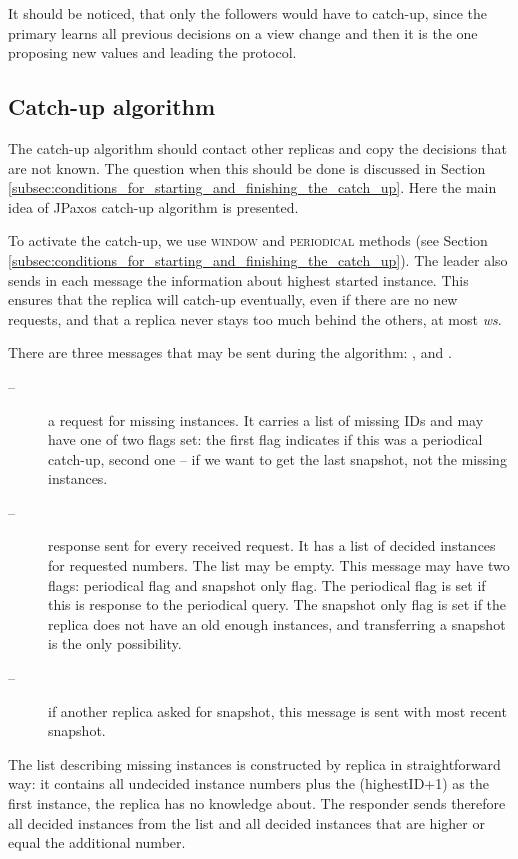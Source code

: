 It should be noticed, that only the followers would have to catch-up, since the primary learns all previous decisions on a view change and then it is the one proposing new values and leading the protocol.

\subsection{Catch-up algorithm}
\label{subsec:catch_up_algorithm}
The catch-up algorithm should contact other replicas and copy the decisions that are not known. The question when this should be done is discussed in Section \ref{subsec:conditions_for_starting_and_finishing_the_catch_up}. Here the main idea of JPaxos catch-up algorithm is presented.

To activate the catch-up, we use \textsc{window} and \textsc{periodical} methods (see Section \ref{subsec:conditions_for_starting_and_finishing_the_catch_up}). The leader also sends in each \alive message the information about highest started instance.
This ensures that the replica will catch-up eventually, even if there are no new requests, and that a replica never stays too much behind the others, at most \textit{ws}.

There are three messages that may be sent during the algorithm: \catchUpQuery[], \catchUpResponse and \catchUpSnapshot[].
\begin{description}
 \item[\normalfont\catchUpQuery --] a request for missing instances. It carries a list of missing IDs and may have one of two flags set: the first flag indicates if this was a periodical catch-up, second one -- 
 if we want to get the last snapshot, not the missing instances.
 \item[\normalfont\catchUpResponse --] response sent for every received request. It has a list of decided instances for requested numbers. The list may be empty. This message may have two flags: periodical flag and snapshot only flag. The periodical flag is set if this is response to the periodical query. The snapshot only flag is set if the replica does not have an old enough instances, and transferring a snapshot is the only possibility.
 \item[\normalfont\catchUpSnapshot --] if another replica asked for snapshot, this message is sent with most recent snapshot.
\end{description}

The list describing missing instances is constructed by replica in straightforward way: it contains all undecided instance numbers plus the (highestID+1) as the first instance, the replica has no knowledge about. The responder sends therefore all decided instances from the list and all decided instances that are higher or equal the additional number.

